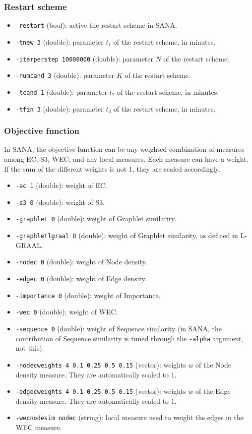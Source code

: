 \documentclass[]{article}
\begin{document}
\subsubsection*{Restart scheme}
\begin{itemize}
\item\texttt{-restart} (bool): active the restart scheme in SANA.
\item\texttt{-tnew 3} (double): parameter $t_1$ of the restart scheme, in minutes.
\item\texttt{-iterperstep 10000000} (double): parameter $N$ of the restart scheme.
\item\texttt{-numcand 3} (double): parameter $K$ of the restart scheme.
\item\texttt{-tcand 1} (double): parameter $t_2$ of the restart scheme, in minutes.
\item\texttt{-tfin 3} (double): parameter $t_3$ of the restart scheme, in minutes.
\end{itemize}
\subsubsection*{Objective function}
In SANA, the objective function can be any weighted combination of measures among EC, S3, WEC, and any local measures. Each measure can have a weight. If the sum of the different weights is not 1, they are scaled accordingly.

\begin{itemize}
\item\texttt{-ec 1} (double): weight of EC.
\item\texttt{-s3 0} (double): weight of S3.
\item\texttt{-graphlet 0} (double): weight of Graphlet similarity.
\item\texttt{-graphletlgraal 0} (double): weight of Graphlet similarity, as defined in L-GRAAL.
\item\texttt{-nodec 0} (double): weight of Node density.
\item\texttt{-edgec 0} (double): weight of Edge density.
\item\texttt{-importance 0} (double): weight of Importance.
\item\texttt{-wec 0} (double): weight of WEC.
\item\texttt{-sequence 0} (double): weight of Sequence similarity (in SANA, the contribution of Sequence similarity is tuned through the \texttt{-alpha} argument, not this).
\item\texttt{-nodecweights 4 0.1 0.25 0.5 0.15} (vector): weights $w$ of the Node density measure. They are automatically scaled to 1.
\item\texttt{-edgecweights 4 0.1 0.25 0.5 0.15} (vector): weights $w$ of the Edge density measure. They are automatically scaled to 1.
\item\texttt{-wecnodesim nodec} (string): local measure used to weight the edges in the WEC measure.
\end{itemize}
\end{document}
